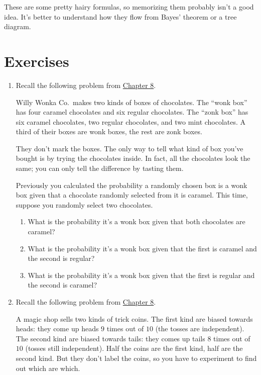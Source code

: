 \documentclass[justified]{tufte-book}
\providecommand{\tightlist}{%
  \setlength{\itemsep}{0pt}\setlength{\parskip}{0pt}}
\theoremstyle{definition}
\theoremstyle{definition}
\theoremstyle{definition}
\theoremstyle{remark}
\begin{document}
These are some pretty hairy formulas, so memorizing them probably isn't
a good idea. It's better to understand how they flow from Bayes' theorem
or a tree diagram.

\hypertarget{exercises-7}{%
\section*{Exercises}\label{exercises-7}}

\begin{enumerate}
\item
  Recall the following problem from
  \protect\hyperlink{bayes-theorem}{Chapter 8}.

  Willy Wonka Co.~makes two kinds of boxes of chocolates. The ``wonk
  box'' has four caramel chocolates and six regular chocolates. The
  ``zonk box'' has six caramel chocolates, two regular chocolates, and
  two mint chocolates. A third of their boxes are wonk boxes, the rest
  are zonk boxes.

  They don't mark the boxes. The only way to tell what kind of box
  you've bought is by trying the chocolates inside. In fact, all the
  chocolates look the same; you can only tell the difference by tasting
  them.

  Previously you calculated the probability a randomly chosen box is a
  wonk box given that a chocolate randomly selected from it is caramel.
  This time, suppose you randomly select two chocolates.

  \begin{enumerate}
  \def\labelenumii{\alph{enumii}.}
  \tightlist
  \item
    What is the probability it's a wonk box given that both chocolates
    are caramel?
  \item
    What is the probability it's a wonk box given that the first is
    caramel and the second is regular?
  \item
    What is the probability it's a wonk box given that the first is
    regular and the second is caramel?
  \end{enumerate}
\item
  Recall the following problem from
  \protect\hyperlink{bayes-theorem}{Chapter 8}.

  A magic shop sells two kinds of trick coins. The first kind are biased
  towards heads: they come up heads \(9\) times out of \(10\) (the
  tosses are independent). The second kind are biased towards tails:
  they comes up tails \(8\) times out of \(10\) (tosses still
  independent). Half the coins are the first kind, half are the second
  kind. But they don't label the coins, so you have to experiment to
  find out which are which.


\end{enumerate}
\end{document}

